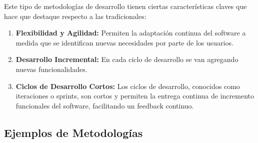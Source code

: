 Este tipo de metodologías de desarrollo tienen ciertas características claves que hace que destaque respecto a las tradicionales:

\begin{enumerate}
    \item \textbf{Flexibilidad y Agilidad:} Permiten la adaptación continua del software a medida que se identifican nuevas necesidades por parte de los usuarios.

    \item \textbf{Desarrollo Incremental:} En cada ciclo de desarrollo se van agregando nuevas funcionalidades.

    \item \textbf{Ciclos de Desarrollo Cortos:} Los ciclos de desarrollo, conocidos como iteraciones o sprints, son cortos y permiten la entrega continua de incremento funcionales del software, facilitando un feedback continuo.
\end{enumerate}

\subsection{Ejemplos de Metodologías}

